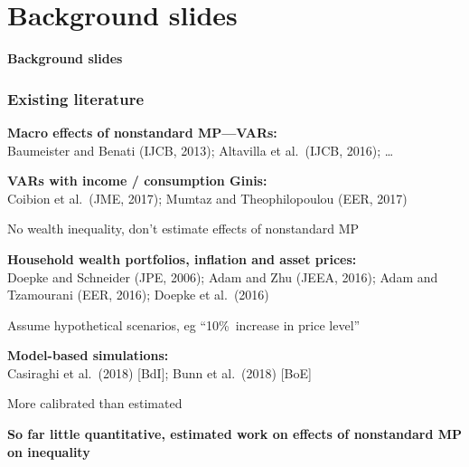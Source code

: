\documentclass[pdflatex,aspectratio=169]{beamer}
\newcommand{\jemph}[1]{{\color{StataDarkBlue}#1}}
\newcommand{\jbemph}[1]{\textbf{\color{SlideNavy}#1}}
\begin{document}

\section{Background slides}
\begin{frame}

\begin{center}
\Large
\jbemph{Background slides}
\end{center}

\end{frame}


\begin{frame}\frametitle{\bf Existing literature}
\bi
\setlength{\itemsep}{2mm}
\item \jbemph{Macro effects of nonstandard MP---VARs:}\\
{\footnotesize Baumeister and Benati (IJCB, 2013); Altavilla et al.\ (IJCB, 2016); \dots}
\item \jbemph{VARs with income / consumption Ginis:}\\
{\footnotesize  Coibion et al.\ (JME, 2017); Mumtaz and Theophilopoulou (EER, 2017)}
\bi
\item No \jemph{wealth} inequality, don't estimate effects of \jemph{nonstandard MP}
\ei
\item \jbemph{Household wealth portfolios, inflation and asset prices:}\\
{\footnotesize  Doepke and Schneider (JPE, 2006); Adam and Zhu (JEEA, 2016); Adam and Tzamourani (EER, 2016); Doepke et al.\ (2016)}
\bi
\item Assume \jemph{hypothetical scenarios,} eg ``10\%\ increase in price level''
\ei
\item \jbemph{Model-based simulations:}\\
{\footnotesize Casiraghi et al.\ (2018) [BdI]; Bunn et al.\ (2018) [BoE]}
\bi
\item More calibrated than estimated
\ei
\ei

\bi
\item \jbemph{So far little quantitative, estimated work on effects of nonstandard MP on inequality}
\ei

\end{frame}
\end{document}
